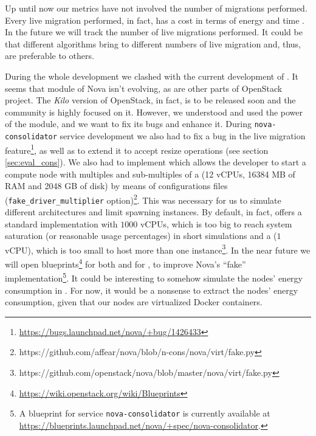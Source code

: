Up until now our metrics have not involved the number of migrations performed. Every live migration performed, in fact, has a cost in terms of energy and time . In the future we will track the number of live migrations performed. It could be that different algorithms bring to different numbers of live migration and, thus, are preferable to others.

During the whole development we clashed with the current development of . It seems that  module of Nova isn't evolving, as are other parts of OpenStack project. The \emph{Kilo} version of OpenStack, in fact, is to be released soon and the community is highly focused on it. However, we understood and used the power of the  module, and we want to fix its bugs and enhance it. During \texttt{nova-consolidator} service development we also had to fix a bug in the live migration feature\footnote{\url{https://bugs.launchpad.net/nova/+bug/1426433}}, as well as to extend it to accept resize operations (see section \ref{sec:eval_cons}). We also had to implement  which allows the developer to start a compute node with multiples and sub-multiples of a  (12 vCPUs, 16384 MB of RAM and 2048 GB of disk) by means of configurations files (\texttt{fake\_driver\_multiplier} option)\footnote{https://github.com/affear/nova/blob/n-cons/nova/virt/fake.py}. This was necessary for us to simulate different architectures and limit spawning instances. By default, in fact,  offers a standard implementation with $1000$ vCPUs, which is too big to reach system saturation (or reasonable usage percentages) in short simulations and a  ($1$ vCPU), which is too small to host more than one instance\footnote{https://github.com/openstack/nova/blob/master/nova/virt/fake.py}. In the near future we will open blueprints\footnote{\url{https://wiki.openstack.org/wiki/Blueprints}} for both  and for , to improve Nova's ``fake'' implementation\footnote{A blueprint for service \texttt{nova-consolidator} is currently available at \url{https://blueprints.launchpad.net/nova/+spec/nova-consolidator}.}. It could be interesting to somehow simulate the nodes' energy consumption in . For now, it would be a nonsense to extract the nodes' energy consumption, given that our nodes are virtualized Docker containers.


